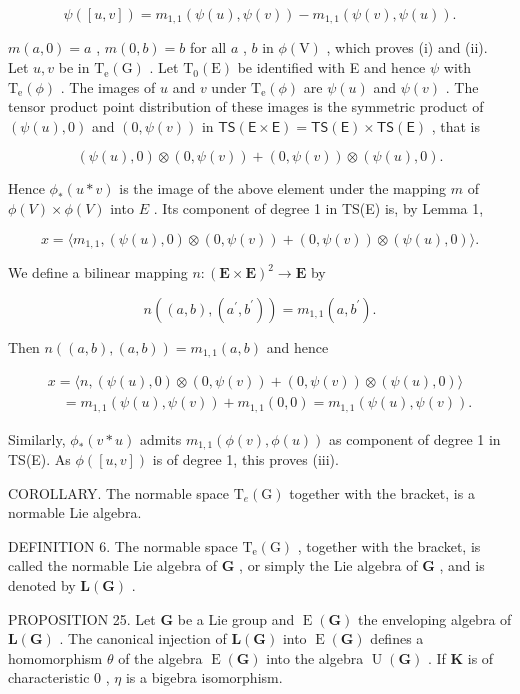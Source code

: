 \[
\psi ([ u, v ]) = m _ {1, 1} (\psi (u), \psi (v)) - m _ {1, 1} (\psi (v), \psi (u)).
\]

\(m(a,0) = a\) , \(m(0,b) = b\) for all \(a\) , \(b\) in \(\phi (\mathrm{V})\) , which proves (i) and (ii). Let \(u, v\) be in \(\mathrm{T_e(G)}\) . Let \(\mathrm{T_0(E)}\) be identified with E and hence \(\psi\) with \(\mathrm{T_e}(\phi)\) . The images of \(u\) and \(v\) under \(\mathrm{T_e}(\phi)\) are \(\psi (u)\) and \(\psi (v)\) . The tensor product point distribution of these images is the symmetric product of \((\psi(u),0)\) and \((0,\psi (v))\) in \(\mathsf{TS(E\times E)} = \mathsf{TS(E)}\times \mathsf{TS(E)}\) , that is

\[
(\psi (u), 0) \otimes (0, \psi (v)) + (0, \psi (v)) \otimes (\psi (u), 0).
\]

Hence \(\phi_{*} (u * v)\) is the image of the above element under the mapping \(m\) of \(\phi(V) \times \phi(V)\) into \(E\) . Its component of degree 1 in TS(E) is, by Lemma 1,

\[
x = \langle m _ {1, 1}, (\psi (u), 0) \otimes (0, \psi (v)) + (0, \psi (v)) \otimes (\psi (u), 0) \rangle .
\]

We define a bilinear mapping \(n\colon (\mathbf{E}\times \mathbf{E})^2\to \mathbf{E}\) by

\[
n ((a, b), (a ^ {\prime}, b ^ {\prime})) = m _ {1, 1} (a, b ^ {\prime}).
\]

Then \(n((a, b), (a, b)) = m_{1,1}(a, b)\) and hence

\[
\begin{array}{l} x = \langle n, (\psi (u), 0) \otimes (0, \psi (v)) + (0, \psi (v)) \otimes (\psi (u), 0) \rangle \\ \quad = m _ {1, 1} (\psi (u), \psi (v)) + m _ {1, 1} (0, 0) = m _ {1, 1} (\psi (u), \psi (v)). \end{array}
\]

Similarly, \(\phi_{*} (v * u)\) admits \(m_{1,1}(\phi(v), \phi(u))\) as component of degree 1 in TS(E). As \(\phi([u, v])\) is of degree 1, this proves (iii).

COROLLARY. The normable space \(\mathrm{T}_e(\mathrm{G})\) together with the bracket, is a normable Lie algebra.

DEFINITION 6. The normable space \(\mathrm{T_e(G)}\) , together with the bracket, is called the normable Lie algebra of \(\mathbf{G}\) , or simply the Lie algebra of \(\mathbf{G}\) , and is denoted by \(\mathbf{L(G)}\) .

PROPOSITION 25. Let \(\mathbf{G}\) be a Lie group and \(\operatorname{E}(\mathbf{G})\) the enveloping algebra of \(\mathbf{L}(\mathbf{G})\) . The canonical injection of \(\mathbf{L}(\mathbf{G})\) into \(\operatorname{E}(\mathbf{G})\) defines a homomorphism \(\theta\) of the algebra \(\operatorname{E}(\mathbf{G})\) into the algebra \(\operatorname{U}(\mathbf{G})\) . If \(\mathbf{K}\) is of characteristic \(0\) , \(\eta\) is a bigebra isomorphism.

